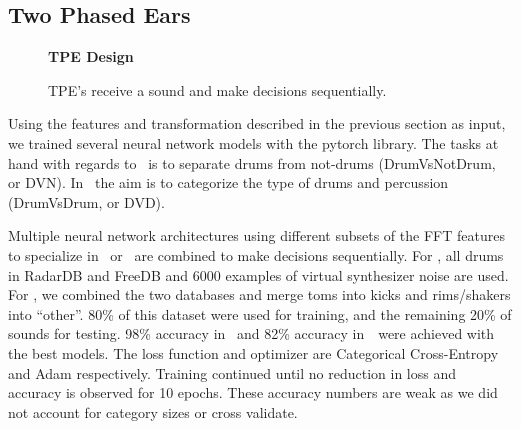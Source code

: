 \documentclass[\main/thesis.tex]{subfiles}
\begin{document}
\subsection{Two Phased Ears}
\label{TPE_models}
\begin{figure}[t!]
    \begin{center}
    \textbf{TPE Design}
    \end{center}
    \caption{TPE's receive a sound and make decisions sequentially.}
\label{fig:TPE_design}
\end{figure}

Using the features and transformation described in the previous section as input, we trained several neural network models with the pytorch library. The tasks at hand with regards to \decfirst~is to separate drums from not-drums (DrumVsNotDrum, or DVN). In \decsecond~the aim is to categorize the type of drums and percussion (DrumVsDrum, or DVD). 

 Multiple neural network architectures using different subsets of the FFT features to specialize in \decfirst~or \decsecond~are combined to make decisions sequentially. For \decfirst, all drums in RadarDB and FreeDB and 6000 examples of virtual synthesizer noise are used. For \decsecond, we combined the two databases and merge toms into kicks and rims/shakers into \enquote{other}. 80\% of this dataset were used for training, and the remaining 20\% of sounds for testing. 98\% accuracy in \decfirst~and 82\% accuracy in~\decsecond~were achieved with the best models. The loss function and optimizer are Categorical Cross-Entropy and Adam respectively. Training continued until no reduction in loss and accuracy is observed for 10 epochs. These accuracy numbers are weak as we did not account for category sizes or cross validate.  
\end{document}
